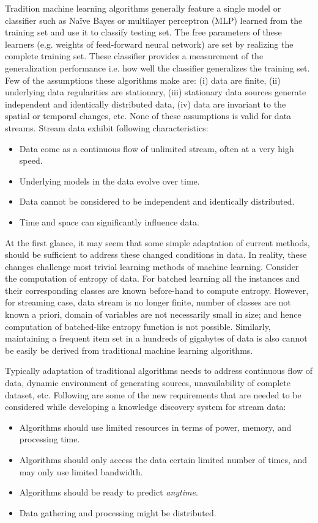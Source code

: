 Tradition machine learning algorithms generally feature a single model or classifier such as Na\"ive Bayes or multilayer perceptron (MLP) learned from the training set and use it to classify testing set. The free parameters of these learners (e.g. weights of feed-forward neural network) are set by realizing the complete training set. These classifier provides a measurement of the generalization performance i.e. how well the classifier generalizes the training set. Few of the assumptions these algorithms make are: (i) data are finite, (ii) underlying data regularities are stationary, (iii) stationary data sources generate independent and identically distributed data, (iv) data are invariant to the spatial or temporal changes, etc. None of these assumptions is valid for data streams. Stream data exhibit following characteristics: 
\begin{itemize}
    \item Data come as a continuous flow of unlimited stream, often at a very high speed.
    \item Underlying models in the data evolve over time.
    \item Data cannot be considered to be independent and identically distributed.
    \item Time and space can significantly influence data.
\end{itemize}
At the first glance, it may seem that some simple adaptation of current methods, should be sufficient to address these changed conditions in data. In reality, these changes challenge most trivial learning methods of machine learning. Consider the computation of entropy of data. For batched learning all the instances and their corresponding classes are known before-hand to compute entropy. However, for streaming case, data stream is no longer finite, number of classes are not known a priori, domain of variables are not necessarily small in size; and hence computation of batched-like entropy function is not possible. Similarly, maintaining a frequent item set in a hundreds of gigabytes of data is also cannot be easily be derived from traditional machine learning algorithms.

Typically adaptation of traditional algorithms needs to address continuous flow of data, dynamic environment of generating sources, unavailability of complete dataset, etc. Following are some of the new requirements that are needed to be considered while developing a knowledge discovery system for stream data:
\begin{itemize}
    \item Algorithms should use limited resources in terms of power, memory, and processing time.
    \item Algorithms should only access the data certain limited number of times, and may only use limited bandwidth.
    \item Algorithms should be ready to predict {\it anytime}. 
    \item Data gathering and processing might be distributed.
\end{itemize}

